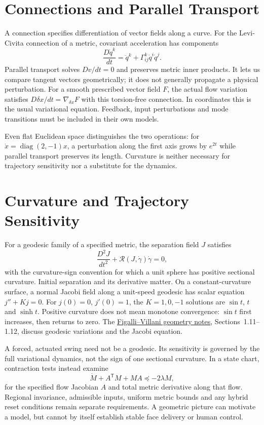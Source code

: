 \documentclass[10pt,letterpaper,openany]{book}
\theoremstyle{plain}
\theoremstyle{definition}
\theoremstyle{remark}
\renewcommand{\T}{\mathsf{T}}   %
\begin{document}
\section{Connections and Parallel Transport}

A connection specifies differentiation of vector fields along a curve. For the
Levi-Civita connection of a metric, covariant acceleration has components
\[
 \frac{D\dot q^k}{dt}=\ddot q^k+\Gamma^k_{ij}\dot q^i\dot q^j.
\]
Parallel transport solves $Dv/dt=0$ and preserves metric inner products. It lets
us compare tangent vectors geometrically; it does not generally propagate a
physical perturbation. For a smooth prescribed vector field $F$, the actual
flow variation satisfies $D\delta x/dt=\nabla_{\delta x}F$ with this torsion-free
connection. In coordinates this is the usual variational equation. Feedback,
input perturbations and mode transitions must be included in their own models.

Even flat Euclidean space distinguishes the two operations: for
$\dot x=\operatorname{diag}(2,-1)x$, a perturbation along the first axis grows by
$e^{2t}$ while parallel transport preserves its length. Curvature is neither
necessary for trajectory sensitivity nor a substitute for the dynamics.

\section{Curvature and Trajectory Sensitivity}

For a geodesic family of a specified metric, the separation field $J$ satisfies
\[
 \frac{D^2J}{dt^2}+\mathcal R(J,\dot\gamma)\dot\gamma=0,
\]
with the curvature-sign convention for which a unit sphere has positive
sectional curvature. Initial separation and its derivative matter. On a
constant-curvature surface, a normal Jacobi field along a unit-speed geodesic
has scalar equation $j''+Kj=0$. For $j(0)=0$, $j'(0)=1$, the $K=1,0,-1$
solutions are $\sin t$, $t$ and $\sinh t$. Positive curvature does not mean
monotone convergence: $\sin t$ first increases, then returns to zero.
The \href{https://people.math.ethz.ch/~afigalli/lecture-notes-pdf/Optimal-Transport-and-Curvature.pdf}{Figalli--Villani geometry notes},
Sections~1.11--1.12, discuss geodesic variations and the Jacobi equation.

A forced, actuated swing need not be a geodesic. Its sensitivity is governed by
the full variational dynamics, not the sign of one sectional curvature. In a
state chart, contraction tests instead examine
\[
 \dot M+A^\T M+MA\preceq-2\lambda M,
\]
for the specified flow Jacobian $A$ and total metric derivative along that flow.
Regional invariance, admissible inputs, uniform metric bounds and any hybrid
reset conditions remain separate requirements. A geometric picture can motivate
a model, but cannot by itself establish stable face delivery or human control.
\end{document}
